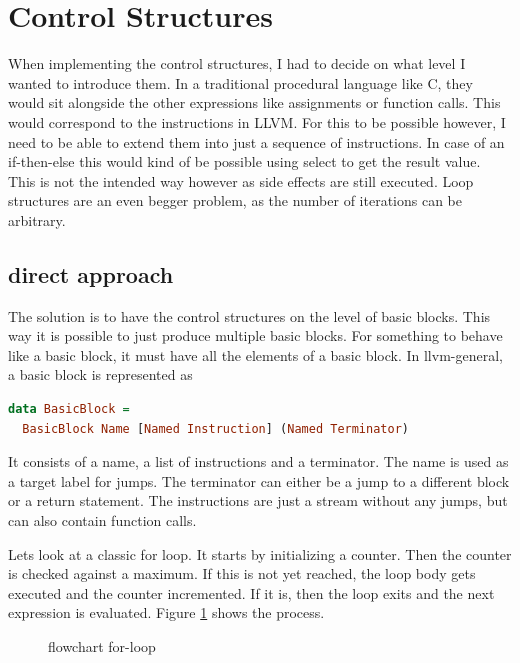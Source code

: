 \documentclass[a4paper,bibliography=totocnumbered,parskip,headsepline]{scrbook}
\begin{document}
\section{Control Structures}
When implementing the control structures, I had to decide on what level I wanted to introduce them.
In a traditional procedural language like C, they would sit alongside the other expressions like assignments or function calls.
This would correspond to the instructions in LLVM.
For this to be possible however, I need to be able to extend them into just a sequence of instructions.
In case of an if-then-else this would kind of be possible using select to get the result value.
This is not the intended way however as side effects are still executed.
Loop structures are an even begger problem, as the number of iterations can be arbitrary.

\subsection{direct approach}
The solution is to have the control structures on the level of basic blocks.
This way it is possible to just produce multiple basic blocks.
For something to behave like a basic block, it must have all the elements of a basic block.
In llvm-general, a basic block is represented as

\begin{lstlisting}[language=haskell]
data BasicBlock =
  BasicBlock Name [Named Instruction] (Named Terminator)
\end{lstlisting}

It consists of a name, a list of instructions and a terminator.
The name is used as a target label for jumps.
The terminator can either be a jump to a different block or a return statement.
The instructions are just a stream without any jumps, but can also contain function calls.

Lets look at a classic for loop.
It starts by initializing a counter.
Then the counter is checked against a maximum.
If this is not yet reached, the loop body gets executed and the counter incremented.
If it is, then the loop exits and the next expression is evaluated.
Figure \ref{fig:forchart} shows the process.

\begin{figure}
\begin{center}
\end{center}
\caption{flowchart for-loop}
\label{fig:forchart}
\end{figure}
\end{document}
